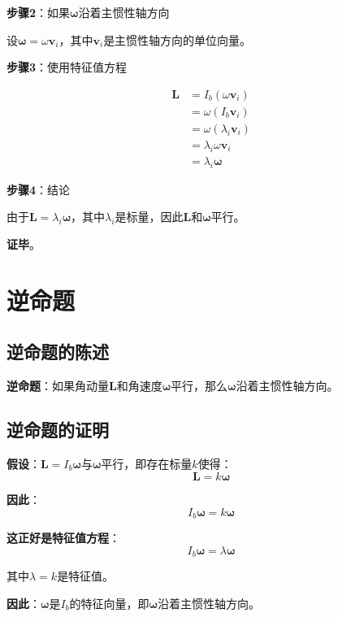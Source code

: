 \documentclass[12pt,a4paper]{article}
\begin{document}
\textbf{步骤2}：如果$\bm{\omega}$沿着主惯性轴方向

设$\bm{\omega} = \omega \bm{v}_i$，其中$\bm{v}_i$是主惯性轴方向的单位向量。

\textbf{步骤3}：使用特征值方程

\begin{align}
\bm{L} &= I_b (\omega \bm{v}_i) \\
&= \omega (I_b \bm{v}_i) \\
&= \omega (\lambda_i \bm{v}_i) \\
&= \lambda_i \omega \bm{v}_i \\
&= \lambda_i \bm{\omega}
\end{align}

\textbf{步骤4}：结论

由于$\bm{L} = \lambda_i \bm{\omega}$，其中$\lambda_i$是标量，因此$\bm{L}$和$\bm{\omega}$平行。

\textbf{证毕}。

\section{逆命题}

\subsection{逆命题的陈述}

\textbf{逆命题}：如果角动量$\bm{L}$和角速度$\bm{\omega}$平行，那么$\bm{\omega}$沿着主惯性轴方向。

\subsection{逆命题的证明}

\textbf{假设}：$\bm{L} = I_b \bm{\omega}$与$\bm{\omega}$平行，即存在标量$k$使得：
\begin{equation}
\bm{L} = k \bm{\omega}
\end{equation}

\textbf{因此}：
\begin{equation}
I_b \bm{\omega} = k \bm{\omega}
\end{equation}

\textbf{这正好是特征值方程}：
\begin{equation}
I_b \bm{\omega} = \lambda \bm{\omega}
\end{equation}

其中$\lambda = k$是特征值。

\textbf{因此}：$\bm{\omega}$是$I_b$的特征向量，即$\bm{\omega}$沿着主惯性轴方向。
\end{document}
